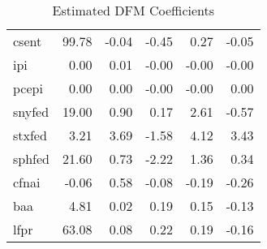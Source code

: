 \documentclass[11pt, letterpaper]{article}\usepackage[]{graphicx}\usepackage[]{color}
\begin{document}
\begin{table}[H]
\begin{tabular}{lrrrrr}
  csent & 99.78 & -0.04 & -0.45 & 0.27 & -0.05 \\ 
  ipi & 0.00 & 0.01 & -0.00 & -0.00 & -0.00 \\ 
  pcepi & 0.00 & 0.00 & -0.00 & -0.00 & 0.00 \\ 
  snyfed & 19.00 & 0.90 & 0.17 & 2.61 & -0.57 \\ 
  stxfed & 3.21 & 3.69 & -1.58 & 4.12 & 3.43 \\ 
  sphfed & 21.60 & 0.73 & -2.22 & 1.36 & 0.34 \\ 
  cfnai & -0.06 & 0.58 & -0.08 & -0.19 & -0.26 \\ 
  baa & 4.81 & 0.02 & 0.19 & 0.15 & -0.13 \\ 
  lfpr & 63.08 & 0.08 & 0.22 & 0.19 & -0.16 \\ 
   \hline
\end{tabular}
\endgroup
\caption{Estimated DFM Coefficients} 
\end{table}
\end{document}
